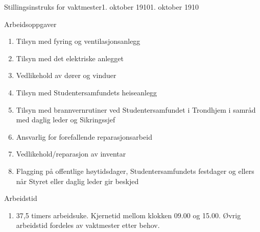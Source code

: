 \begin{instruks}{Stillingsinstruks for vaktmester}{1. oktober 1910}{1. oktober 1910}
    \begin{instruksledd}{Arbeidsoppgaver}
        \begin{enumerate}
            \item Tilsyn med fyring og ventilasjonsanlegg
            \item Tilsyn med det elektriske anlegget
            \item Vedlikehold av dører og vinduer
            \item Tilsyn med Studentersamfundets heiseanlegg
            \item Tilsyn med brannvernrutiner ved Studentersamfundet i Trondhjem i samråd med daglig leder og Sikringssjef
            \item Ansvarlig for forefallende reparasjonsarbeid
            \item Vedlikehold/reparasjon av inventar
            \item Flagging på offentlige høytidsdager, Studentersamfundets festdager og ellers når Styret eller daglig leder gir
                beskjed   
        \end{enumerate}
    \end{instruksledd}

    \begin{instruksledd}{Arbeidstid}
        \begin{enumerate}
            \item 37,5 timers arbeidsuke. Kjernetid mellom klokken 09.00 og 15.00. Øvrig arbeidstid fordeles av vaktmester
                etter behov. 
        \end{enumerate}
    \end{instruksledd}

\end{instruks}




